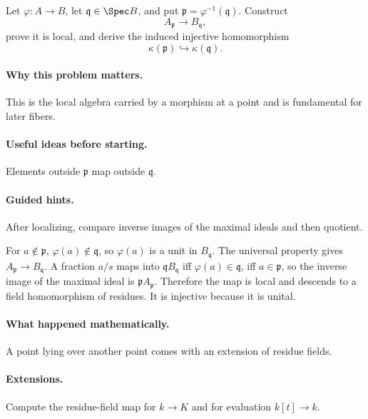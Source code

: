 \begin{problem}
Let $\varphi:A\to B$, let $\mathfrak q\in\Spec B$, and put $\mathfrak p=\varphi^{-1}(\mathfrak q)$.  Construct
\[
A_{\mathfrak p}\to B_{\mathfrak q},
\]
prove it is local, and derive the induced injective homomorphism
\[
\kappa(\mathfrak p)\hookrightarrow\kappa(\mathfrak q).
\]
\end{problem}

\paragraph{Why this problem matters.}
This is the local algebra carried by a morphism at a point and is fundamental for later fibers.

\paragraph{Useful ideas before starting.}
Elements outside $\mathfrak p$ map outside $\mathfrak q$.

\paragraph{Guided hints.}
After localizing, compare inverse images of the maximal ideals and then quotient.

\begin{solution}
For $a\notin\mathfrak p$, $\varphi(a)\notin\mathfrak q$, so $\varphi(a)$ is a unit in $B_{\mathfrak q}$.  The universal property gives $A_{\mathfrak p}\to B_{\mathfrak q}$.  A fraction $a/s$ maps into $\mathfrak qB_{\mathfrak q}$ iff $\varphi(a)\in\mathfrak q$, iff $a\in\mathfrak p$, so the inverse image of the maximal ideal is $\mathfrak pA_{\mathfrak p}$.  Therefore the map is local and descends to a field homomorphism of residues.  It is injective because it is unital.
\end{solution}

\paragraph{What happened mathematically.}
A point lying over another point comes with an extension of residue fields.

\paragraph{Extensions.}
Compute the residue-field map for $k\to K$ and for evaluation $k[t]\to k$.
